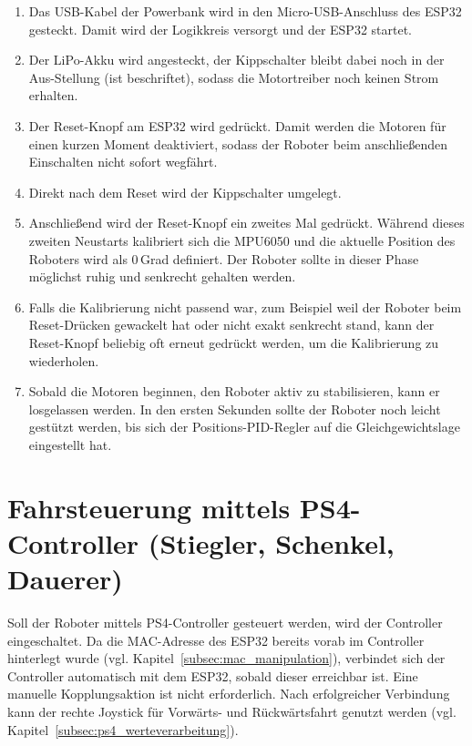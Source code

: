 \documentclass[fontsize=12pt,
parskip=half,	%
department=FakM,  %
logostyle=flat,
twoside, %
DIV=15,BCOR=10mm, %
]{OTHRreprt}
\begin{document}
\begin{enumerate}
    \item Das USB-Kabel der Powerbank wird in den Micro-USB-Anschluss des ESP32 gesteckt. Damit wird der Logikkreis versorgt und der ESP32 startet.
    \item Der LiPo-Akku wird angesteckt, der Kippschalter bleibt dabei noch in der Aus-Stellung (ist beschriftet), sodass die Motortreiber noch keinen Strom erhalten.
    \item Der Reset-Knopf am ESP32 wird gedrückt. Damit werden die Motoren für einen kurzen Moment deaktiviert, sodass der Roboter beim anschließenden Einschalten nicht sofort wegfährt.
    \item Direkt nach dem Reset wird der Kippschalter umgelegt.
    \item Anschließend wird der Reset-Knopf ein zweites Mal gedrückt. Während dieses zweiten Neustarts kalibriert sich die MPU6050 und die aktuelle Position des Roboters wird als 0\,Grad definiert. Der Roboter sollte in dieser Phase möglichst ruhig und senkrecht gehalten werden.
    \item Falls die Kalibrierung nicht passend war, zum Beispiel weil der Roboter beim Reset-Drücken gewackelt hat oder nicht exakt senkrecht stand, kann der Reset-Knopf beliebig oft erneut gedrückt werden, um die Kalibrierung zu wiederholen.
    \item Sobald die Motoren beginnen, den Roboter aktiv zu stabilisieren, kann er losgelassen werden. In den ersten Sekunden sollte der Roboter noch leicht gestützt werden, bis sich der Positions-PID-Regler auf die Gleichgewichtslage eingestellt hat.
\end{enumerate}

\section{Fahrsteuerung mittels PS4-Controller (Stiegler, Schenkel, Dauerer)}
\label{sec:inbetrieb_ps4}

Soll der Roboter mittels PS4-Controller gesteuert werden, wird der Controller eingeschaltet. Da die MAC-Adresse des ESP32 bereits vorab im Controller hinterlegt wurde (vgl. Kapitel~\ref{subsec:mac_manipulation}), verbindet sich der Controller automatisch mit dem ESP32, sobald dieser erreichbar ist. Eine manuelle Kopplungsaktion ist nicht erforderlich. Nach erfolgreicher Verbindung kann der rechte Joystick für Vorwärts- und Rückwärtsfahrt genutzt werden (vgl. Kapitel~\ref{subsec:ps4_werteverarbeitung}).
\end{document}
